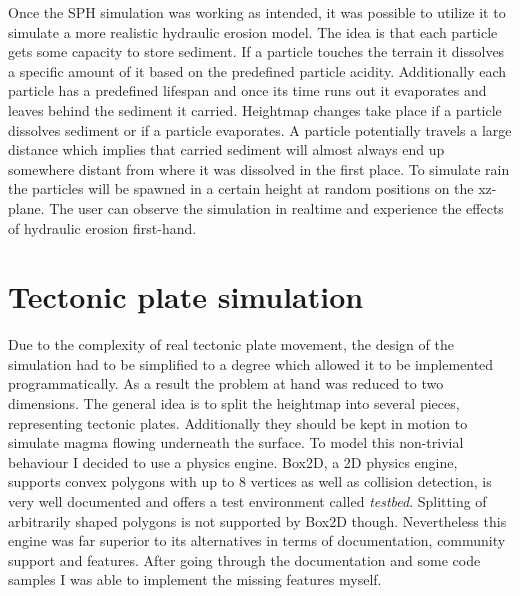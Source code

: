 \documentclass[11pt,a4paper,twoside,openright]{report}
\begin{document}
Once the SPH simulation was working as intended, it was possible to utilize it to simulate a more realistic hydraulic erosion model. The idea is that each particle gets some capacity to store sediment. If a particle touches the terrain it dissolves a specific amount of it based on the predefined particle acidity. Additionally each particle has a predefined lifespan and once its time runs out it evaporates and leaves behind the sediment it carried. Heightmap changes take place if a particle dissolves sediment or if a particle evaporates. A particle potentially travels a large distance which implies that carried sediment will almost always end up somewhere distant from where it was dissolved in the first place. To simulate rain the particles will be spawned in a certain height at random positions on the xz-plane. The user can observe the simulation in realtime and experience the effects of hydraulic erosion first-hand.

\section{Tectonic plate simulation}
\label{sec:tectonicplatesimulation}
Due to the complexity of real tectonic plate movement, the design of the simulation had to be simplified to a degree which allowed it to be implemented programmatically. As a result the problem at hand was reduced to two dimensions. The general idea is to split the heightmap into several pieces, representing tectonic plates. Additionally they should be kept in motion to simulate magma flowing underneath the surface. To model this non-trivial behaviour I decided to use a physics engine. Box2D, a 2D physics engine, supports convex polygons with up to 8 vertices as well as collision detection, is very well documented and offers a test environment called \emph{testbed}. Splitting of arbitrarily shaped polygons is not supported by Box2D though. Nevertheless this engine was far superior to its alternatives in terms of documentation, community support and features. After going through the documentation and some code samples I was able to implement the missing features myself.
\end{document}
